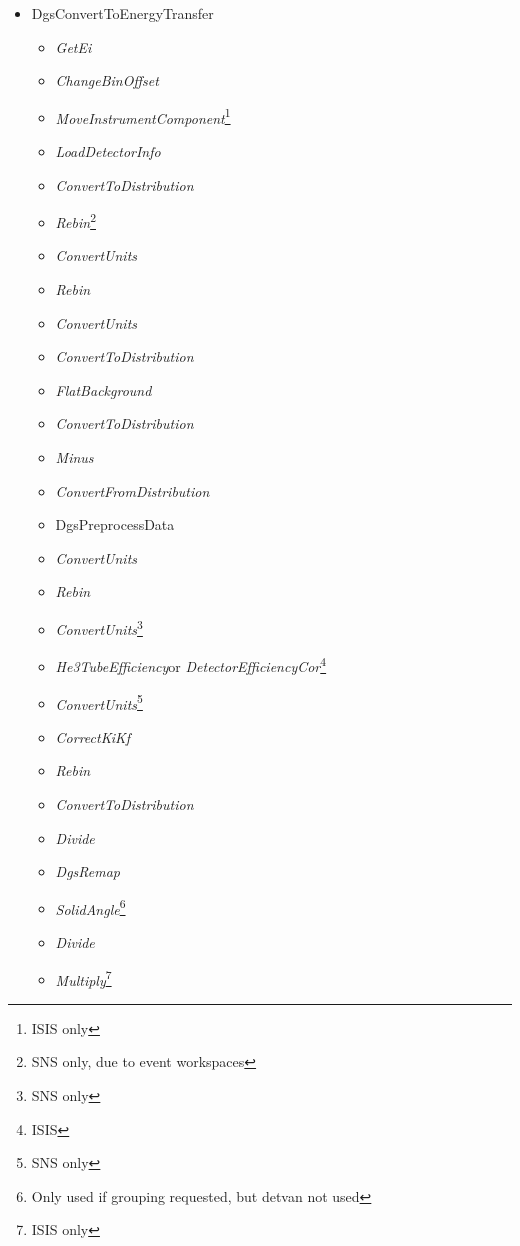 \begin{itemize}
\item DgsConvertToEnergyTransfer
\begin{itemize}
\item \textit{GetEi}
\item \textit{ChangeBinOffset}
\item \textit{MoveInstrumentComponent}\footnote{ISIS only}
\item \textit{LoadDetectorInfo}\footnotemark[\value{footnote}]
\item \textit{ConvertToDistribution}
\item \textit{Rebin}\footnote{SNS only, due to event workspaces}
\item \textit{ConvertUnits}\footnotemark[\value{footnote}]
\item \textit{Rebin}\footnotemark[\value{footnote}]
\item \textit{ConvertUnits}\footnotemark[\value{footnote}]
\item \textit{ConvertToDistribution}\footnotemark[\value{footnote}]
\item \textit{FlatBackground}
\item \textit{ConvertToDistribution}\footnotemark[\value{footnote}]
\item \textit{Minus}\footnotemark[\value{footnote}]
\item \textit{ConvertFromDistribution}
\item DgsPreprocessData
\item \textit{ConvertUnits}
\item \textit{Rebin}
\item \textit{ConvertUnits}\footnote{SNS only}
\item \textit{He3TubeEfficiency}\footnotemark[\value{footnote}] or \textit{DetectorEfficiencyCor}\footnote{ISIS}
\item \textit{ConvertUnits}\footnote{SNS only}
\item \textit{CorrectKiKf}
\item \textit{Rebin}
\item \textit{ConvertToDistribution}
\item \textit{Divide}
\item \textit{DgsRemap}
\item \textit{SolidAngle}\footnote{Only used if grouping requested, but detvan not used}
\item \textit{Divide}\footnotemark[\value{footnote}]
\item \textit{Multiply}\footnote{ISIS only}
\end{itemize}
\end{itemize}

